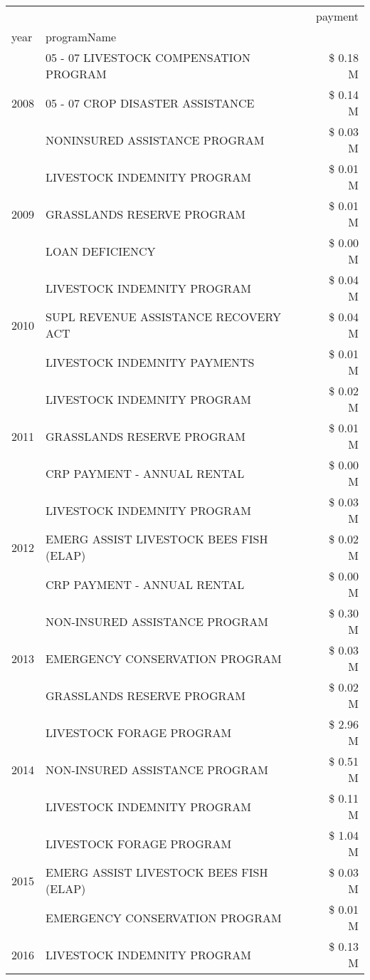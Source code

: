 \begin{tabular}{llr}
\toprule
 &  & payment \\
year & programName &  \\
\midrule
\multirow[t]{3}{*}{2008} & 05 - 07 LIVESTOCK COMPENSATION PROGRAM & \$ 0.18 M \\
 & 05 - 07 CROP DISASTER ASSISTANCE & \$ 0.14 M \\
 & NONINSURED ASSISTANCE PROGRAM & \$ 0.03 M \\
\cline{1-3}
\multirow[t]{3}{*}{2009} & LIVESTOCK INDEMNITY PROGRAM & \$ 0.01 M \\
 & GRASSLANDS RESERVE PROGRAM & \$ 0.01 M \\
 & LOAN DEFICIENCY & \$ 0.00 M \\
\cline{1-3}
\multirow[t]{3}{*}{2010} & LIVESTOCK INDEMNITY PROGRAM & \$ 0.04 M \\
 & SUPL REVENUE ASSISTANCE RECOVERY ACT & \$ 0.04 M \\
 & LIVESTOCK INDEMNITY PAYMENTS & \$ 0.01 M \\
\cline{1-3}
\multirow[t]{3}{*}{2011} & LIVESTOCK INDEMNITY PROGRAM & \$ 0.02 M \\
 & GRASSLANDS RESERVE PROGRAM & \$ 0.01 M \\
 & CRP PAYMENT - ANNUAL RENTAL & \$ 0.00 M \\
\cline{1-3}
\multirow[t]{3}{*}{2012} & LIVESTOCK INDEMNITY PROGRAM & \$ 0.03 M \\
 & EMERG ASSIST LIVESTOCK BEES FISH (ELAP) & \$ 0.02 M \\
 & CRP PAYMENT - ANNUAL RENTAL & \$ 0.00 M \\
\cline{1-3}
\multirow[t]{3}{*}{2013} & NON-INSURED ASSISTANCE PROGRAM & \$ 0.30 M \\
 & EMERGENCY CONSERVATION PROGRAM & \$ 0.03 M \\
 & GRASSLANDS RESERVE PROGRAM & \$ 0.02 M \\
\cline{1-3}
\multirow[t]{3}{*}{2014} & LIVESTOCK FORAGE PROGRAM & \$ 2.96 M \\
 & NON-INSURED ASSISTANCE PROGRAM & \$ 0.51 M \\
 & LIVESTOCK INDEMNITY PROGRAM & \$ 0.11 M \\
\cline{1-3}
\multirow[t]{3}{*}{2015} & LIVESTOCK FORAGE PROGRAM & \$ 1.04 M \\
 & EMERG ASSIST LIVESTOCK BEES FISH (ELAP) & \$ 0.03 M \\
 & EMERGENCY CONSERVATION PROGRAM & \$ 0.01 M \\
\cline{1-3}
\multirow[t]{3}{*}{2016} & LIVESTOCK INDEMNITY PROGRAM & \$ 0.13 M \\

\end{tabular}
